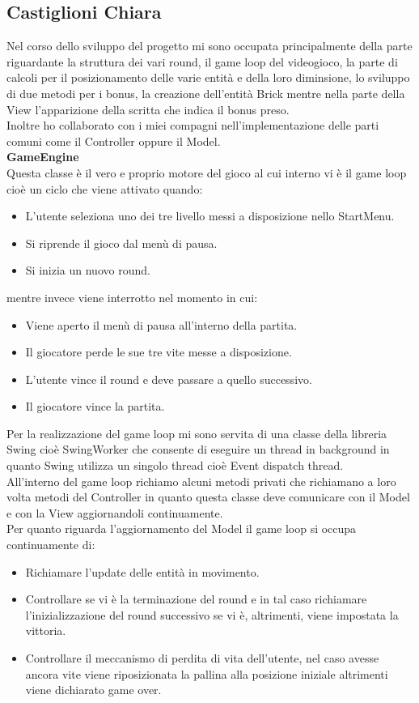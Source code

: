 \documentclass[a4paper,12pt]{report}
\begin{document}
\pagebreak
\subsection{Castiglioni Chiara}
Nel corso dello sviluppo del progetto mi sono occupata principalmente della parte riguardante la struttura dei vari round, il game loop del videogioco,
la parte di calcoli per il posizionamento delle varie entità e della loro diminsione, lo sviluppo di due metodi per i bonus, la creazione dell'entità Brick
mentre nella parte della View l'apparizione della scritta che indica il bonus preso.\\Inoltre ho collaborato con i miei compagni nell'implementazione delle parti comuni come
il Controller oppure il Model.\\
\textbf{GameEngine}
\\Questa classe è il vero e proprio motore del gioco al cui interno vi è il game loop cioè un ciclo che viene attivato quando:
\begin{itemize}
    \item L'utente seleziona uno dei tre livello messi a disposizione nello StartMenu.
    \item Si riprende il gioco dal menù di pausa.
    \item Si inizia un nuovo round.
\end{itemize}
mentre invece viene interrotto nel momento in cui:
\begin{itemize}
    \item Viene aperto il menù di pausa all'interno della partita.
    \item Il giocatore perde le sue tre vite messe a disposizione.
    \item L'utente vince il round e deve passare a quello successivo.
    \item Il giocatore vince la partita.
\end{itemize}
Per la realizzazione del game loop mi sono servita di una classe della libreria Swing cioè SwingWorker che consente di eseguire un thread in background
in quanto Swing utilizza un singolo thread cioè Event dispatch thread.
\\All'interno del game loop richiamo alcuni metodi privati che richiamano a loro volta metodi del Controller in quanto questa classe deve comunicare con il Model
e con la View aggiornandoli continuamente.
\\Per quanto riguarda l'aggiornamento del Model il game loop si occupa continuamente di:
\begin{itemize}
    \item Richiamare l'update delle entità in movimento.
    \item Controllare se vi è la terminazione del round e in tal caso richiamare l'inizializzazione del round successivo se vi è, altrimenti, viene impostata la vittoria.
    \item Controllare il meccanismo di perdita di vita dell'utente, nel caso avesse ancora vite viene riposizionata la pallina alla posizione iniziale altrimenti viene dichiarato game over.
\end{itemize}
\end{document}
